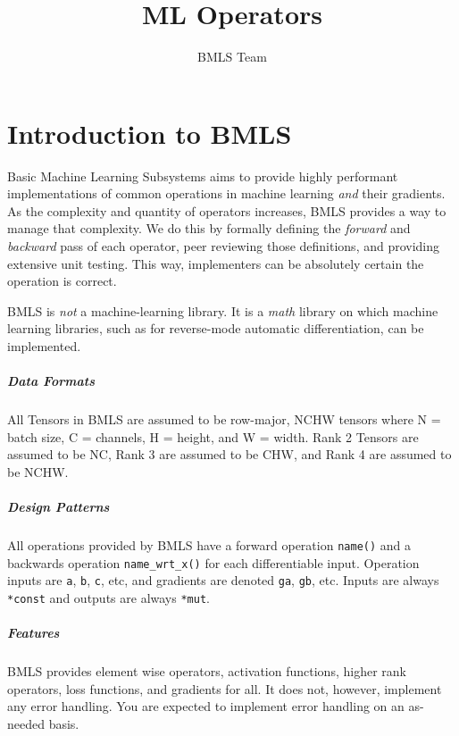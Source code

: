 \documentclass{report}
\title{ML Operators}
\author{BMLS Team}
\begin{document}
    \maketitle

    \tableofcontents

    \chapter{Introduction to BMLS}

    Basic Machine Learning Subsystems aims to provide highly performant implementations of common operations in machine learning \textit{and}
    their gradients. As the complexity and quantity of operators increases, BMLS provides a way to manage that complexity. We do this by 
    formally defining the \textit{forward} and \textit{backward} pass of each operator, peer reviewing those definitions, and providing extensive
    unit testing. This way, implementers can be absolutely certain the operation is correct.

        BMLS is \textit{not} a machine-learning library. It is a \textit{math} library on which machine learning libraries, such as for reverse-mode
        automatic differentiation, can be implemented.

        \paragraph{Data Formats}
        All Tensors in BMLS are assumed to be row-major, NCHW tensors where N = batch size, C = channels, H = height, and W = width. Rank 2 Tensors
        are assumed to be NC, Rank 3 are assumed to be CHW, and Rank 4 are assumed to be NCHW. 

        \paragraph{Design Patterns}
        All operations provided by BMLS have a forward operation \verb|name()| and a backwards operation \verb|name_wrt_x()| for each 
        differentiable input. Operation inputs are \verb|a|, \verb|b|, \verb|c|, etc, and gradients are denoted \verb|ga|, \verb|gb|, etc.
        Inputs are always \verb|*const| and outputs are always \verb|*mut|.
    
        \paragraph{Features}
        BMLS provides element wise operators, activation functions, higher rank operators, loss functions, and gradients for all. 
        It does not, however, implement any error handling. You are expected to implement error handling on an as-needed basis. 
\end{document}
